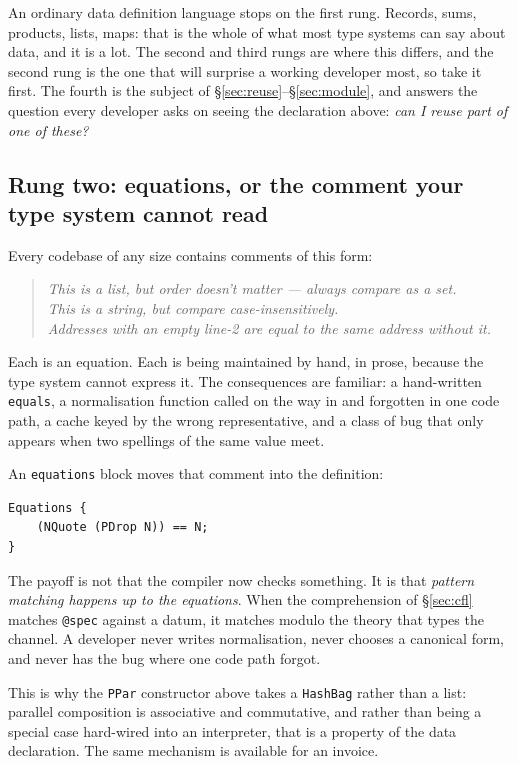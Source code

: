 An ordinary data definition language stops on the first rung. Records, sums,
products, lists, maps: that is the whole of what most type systems can say about
data, and it is a lot. The second and third rungs are where this differs, and
the second rung is the one that will surprise a working developer most, so take
it first. The fourth is the subject of \S\ref{sec:reuse}--\S\ref{sec:module},
and answers the question every developer asks on seeing the declaration above:
\emph{can I reuse part of one of these?}

\subsection{Rung two: equations, or the comment your type system cannot read}

Every codebase of any size contains comments of this form:

\begin{quote}\small
\emph{This is a list, but order doesn't matter --- always compare as a set.}\\
\emph{This is a string, but compare case-insensitively.}\\
\emph{Addresses with an empty line-2 are equal to the same address without it.}
\end{quote}

Each is an equation. Each is being maintained by hand, in prose, because the
type system cannot express it. The consequences are familiar: a hand-written
\texttt{equals}, a normalisation function called on the way in and forgotten in
one code path, a cache keyed by the wrong representative, and a class of bug
that only appears when two spellings of the same value meet.

An \texttt{equations} block moves that comment into the definition:

\begin{lstlisting}[language=mettail]
Equations {
    (NQuote (PDrop N)) == N;
}
\end{lstlisting}

The payoff is not that the compiler now checks something. It is that
\emph{pattern matching happens up to the equations}. When the comprehension of
\S\ref{sec:cfl} matches \texttt{@spec} against a datum, it matches modulo the
theory that types the channel. A developer never writes normalisation, never
chooses a canonical form, and never has the bug where one code path forgot.

This is why the \texttt{PPar} constructor above takes a \texttt{HashBag} rather
than a list: parallel composition is associative and commutative, and rather
than being a special case hard-wired into an interpreter, that is a property of
the data declaration. The same mechanism is available for an invoice.

